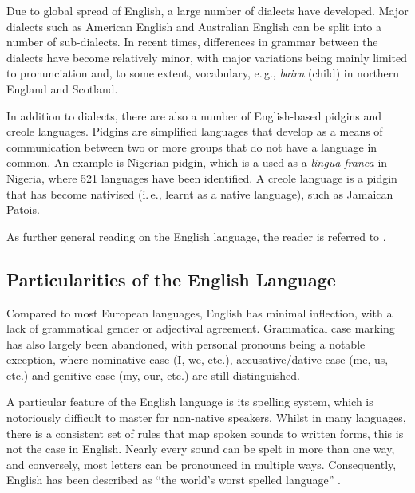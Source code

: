 \documentclass[]{../../metanetpaper}
\begin{document}
\begin{multicols}{2}
    
Due to global spread of English, a large number of dialects have developed. Major dialects such as American English and Australian English can be split into a number of sub-dialects. In recent times, differences in grammar between the dialects have become relatively minor, with major variations being mainly limited to pronunciation and, to some extent, vocabulary, e.\,g., \textit{bairn} (child) in northern England and Scotland.         
    
In addition to dialects, there are also a number of English-based pidgins and creole languages. Pidgins are simplified languages that develop as a means of communication between two or more groups that do not have a language in common. An example is Nigerian pidgin, which is a used as a \textit{lingua franca} in Nigeria, where 521 languages have been identified. A creole language is a pidgin that has become nativised (i.\,e., learnt as a native language), such as Jamaican Patois.
    
As further general reading on the English language, the reader is referred to \cite{crystal1,crystal2,bragg,bryson}.

\subsection{Particularities of the English Language}

Compared to most European languages, English has minimal inflection, with a lack of grammatical gender or adjectival agreement. Grammatical case marking has also largely been abandoned, with personal pronouns being a notable exception, where nominative case (I, we, etc.), accusative/dative case (me, us, etc.) and genitive case (my, our, etc.) are still distinguished. 

A particular feature of the English language is its spelling system, which is notoriously difficult to master for non-native speakers. Whilst in many languages, there is a consistent set of rules that map spoken sounds to written forms, this is not the case in English. Nearly every sound can be spelt in more than one way, and conversely, most letters can be pronounced in multiple ways. Consequently, English has been described as ``the world's worst spelled language'' \cite{Laubach}.  


\end{multicols}
\end{document}
